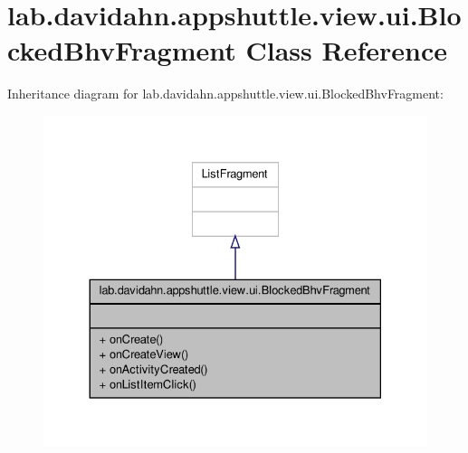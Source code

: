 \hypertarget{classlab_1_1davidahn_1_1appshuttle_1_1view_1_1ui_1_1_blocked_bhv_fragment}{\section{lab.\-davidahn.\-appshuttle.\-view.\-ui.\-Blocked\-Bhv\-Fragment \-Class \-Reference}
\label{classlab_1_1davidahn_1_1appshuttle_1_1view_1_1ui_1_1_blocked_bhv_fragment}
}


\-Inheritance diagram for lab.\-davidahn.\-appshuttle.\-view.\-ui.\-Blocked\-Bhv\-Fragment\-:
\nopagebreak
\begin{figure}[H]
\begin{center}
\leavevmode
\includegraphics[width=330pt]{classlab_1_1davidahn_1_1appshuttle_1_1view_1_1ui_1_1_blocked_bhv_fragment__inherit__graph}
\end{center}
\end{figure}


